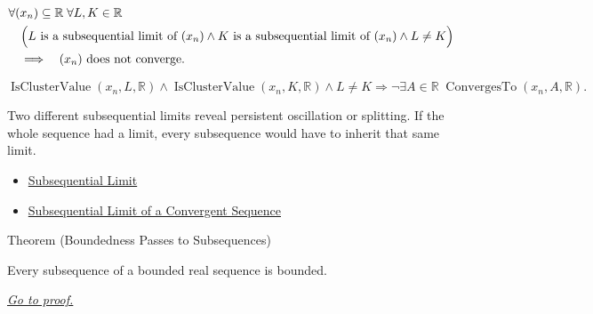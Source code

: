 \begin{remark*}
\[
\begin{aligned}
&\forall (x_n)\subseteq\mathbb{R}\;\forall L,K\in\mathbb{R}\\
&\quad\Bigl(
  L\text{ is a subsequential limit of }(x_n)
  \land
  K\text{ is a subsequential limit of }(x_n)
  \land
  L\neq K
\Bigr)\\
&\quad\Longrightarrow\quad
\text{$(x_n)$ does not converge}.
\end{aligned}
\]
\end{remark*}

\begin{remark*}
\[
\operatorname{IsClusterValue}(x_n,L,\mathbb{R})
\land
\operatorname{IsClusterValue}(x_n,K,\mathbb{R})
\land
L\neq K
\Longrightarrow
\neg\exists A\in\mathbb{R}\;\operatorname{ConvergesTo}(x_n,A,\mathbb{R}).
\]
\end{remark*}

\begin{remark*}[Interpretation]
Two different subsequential limits reveal persistent oscillation or splitting.
If the whole sequence had a limit, every subsequence would have to inherit
that same limit.
\end{remark*}

\begin{dependencies}
\begin{itemize}
  \item \hyperref[def:subsequential-limit]{Subsequential Limit}
  \item \hyperref[thm:subsequential-limit-of-convergent-sequence]{Subsequential Limit of a Convergent Sequence}
\end{itemize}
\end{dependencies}


\begin{theorembox}{Theorem (Boundedness Passes to Subsequences)}
\begin{theorem}
\label{thm:boundedness-passes-to-subsequences}
Every subsequence of a bounded real sequence is bounded.

\smallskip
\noindent
\hyperref[prf:boundedness-passes-to-subsequences]{\textit{Go to proof.}}
\end{theorem}
\end{theorembox}

